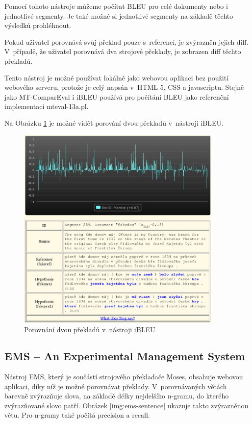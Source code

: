 Pomocí tohoto nástroje můžeme počítat BLEU pro celé dokumenty nebo i jednotlivé segmenty.
Je také možné si jednotlivé segmenty na základě těchto výsledků prohléhnout.

Pokud uživatel porovnává svůj překlad pouze s~referencí,
  je zvýrazněn jejich diff.
V~případě, že uživatel porovnává dva strojové překlady,
  je zobrazen diff těchto překladů.

Tento nástroj je možné používat lokálně jako webovou aplikaci bez použití webového serveru,
  protože je celý napsán v~HTML 5, CSS a javascriptu.
Stejně jako \mbox{MT-ComparEval} i iBLEU používá pro počítání BLEU jako referenční implementaci mteval-13a.pl.

Na Obrázku \ref{img:ibleu} je možné vidět porování dvou překladů v~nástroji iBLEU.
\begin{figure}
  \center
  \includegraphics[width=0.9\textwidth]{img/ibleu.eps}
  \caption{Porovnání dvou překladů v~nástroji iBLEU}
  \label{img:ibleu}
\end{figure}


\subsection{EMS -- An Experimental Management System}
Nástroj EMS,
  který je součástí strojového překladače Moses,
  obsahuje webovou aplikaci,
  díky níž je možné porovnávat překlady.
V~porovnávaných větách barevně zvýrazňuje slova,
  na základě délky nejdelšího \mbox{n-gramu},
  do kterého zvýrazňované slovo patří.
Obrázek \ref{img:ems-sentence} ukazuje takto zvýrazněnou větu.
Pro \mbox{n-gramy} také počítá precision a recall.

